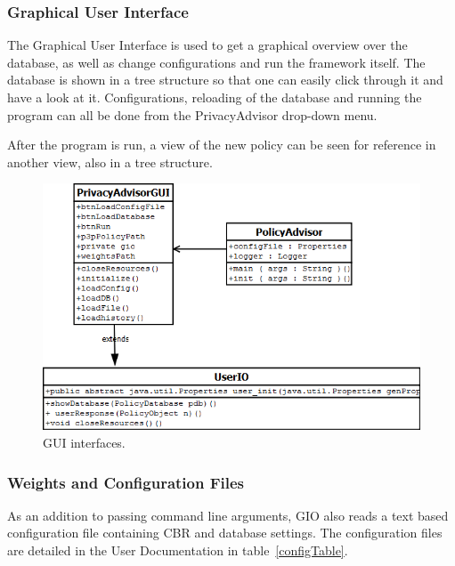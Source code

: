 \subsubsection{Graphical User Interface} 
The Graphical User Interface is used to get a graphical overview over the database, as well as change configurations and run the framework itself. The database is shown in a tree structure so that one can easily click through it and have a look at it. Configurations, reloading of the database and running the program can all be done from the PrivacyAdvisor drop-down menu.

After the program is run, a view of the new policy can be seen for reference in another view, also in a tree structure.

\begin{figure}[htbp]
\begin{center}
\includegraphics[width = \textwidth]{DesignReport/uml/policyadvisorgui}
\caption{GUI interfaces.}
\label{GUI_interface}
\end{center}
\end{figure}

\subsubsection{Weights and Configuration Files}
As an addition to passing command line arguments, GIO also reads a text based configuration file containing CBR and database settings. The configuration files are detailed in the User Documentation in table~\ref{configTable}. 
